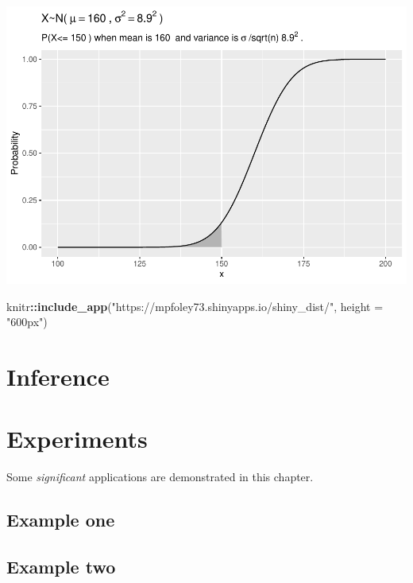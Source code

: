\documentclass[
]{book}
\newenvironment{Shaded}{\begin{snugshade}}{\end{snugshade}}
\newcommand{\DataTypeTok}[1]{\textcolor[rgb]{0.13,0.29,0.53}{#1}}
\newcommand{\KeywordTok}[1]{\textcolor[rgb]{0.13,0.29,0.53}{\textbf{#1}}}
\newcommand{\NormalTok}[1]{#1}
\newcommand{\OperatorTok}[1]{\textcolor[rgb]{0.81,0.36,0.00}{\textbf{#1}}}
\newcommand{\StringTok}[1]{\textcolor[rgb]{0.31,0.60,0.02}{#1}}
\begin{document}
\includegraphics{data-sci_files/figure-latex/unnamed-chunk-19-1.pdf}

\begin{Shaded}
\begin{Highlighting}[]
\NormalTok{knitr}\OperatorTok{::}\KeywordTok{include_app}\NormalTok{(}\StringTok{"https://mpfoley73.shinyapps.io/shiny_dist/"}\NormalTok{, }
  \DataTypeTok{height =} \StringTok{"600px"}\NormalTok{)}
\end{Highlighting}
\end{Shaded}

\hypertarget{inference}{%
\chapter{Inference}\label{inference}}

\hypertarget{experiments}{%
\chapter{Experiments}\label{experiments}}

Some \emph{significant} applications are demonstrated in this chapter.

\hypertarget{example-one}{%
\section{Example one}\label{example-one}}

\hypertarget{example-two}{%
\section{Example two}\label{example-two}}
\end{document}
